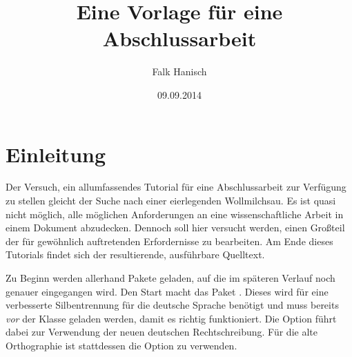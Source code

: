 \documentclass[english,ngerman]{tudscrartcl}
\begin{document}
\title{Eine Vorlage für eine Abschlussarbeit}
\author{Falk Hanisch}
\date{09.09.2014}
\StartTutorial[\tableofcontents]
%
\section{Einleitung}
Der Versuch, ein allumfassendes Tutorial für eine Abschlussarbeit zur Verfügung 
zu stellen gleicht der Suche nach einer eierlegenden Wollmilchsau. Es ist quasi 
nicht möglich, alle möglichen Anforderungen an eine wissenschaftliche Arbeit in 
einem Dokument abzudecken. Dennoch soll hier versucht werden, einen Großteil 
der für gewöhnlich auftretenden Erfordernisse zu bearbeiten. Am Ende dieses 
Tutorials findet sich der resultierende, ausführbare Quelltext.

Zu Beginn werden allerhand Pakete geladen, auf die im späteren Verlauf noch 
genauer eingegangen wird. Den Start macht das Paket . Dieses 
wird für eine verbesserte Silbentrennung für die deutsche Sprache benötigt und 
muss bereits \emph{vor} der Klasse geladen werden, damit es richtig 
funktioniert. Die Option  führt dabei zur Verwendung der neuen 
deutschen Rechtschreibung. Für die alte Orthographie ist stattdessen die Option 
 zu verwenden.
\end{document}
